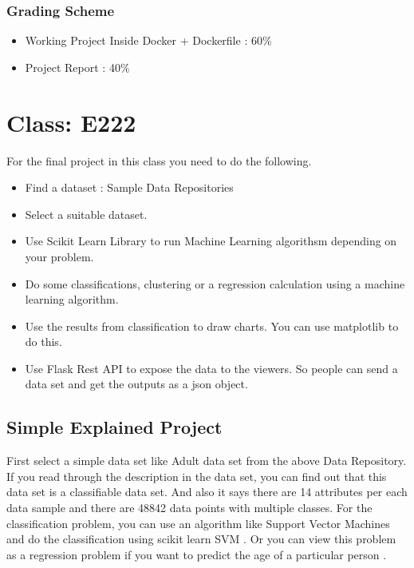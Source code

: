 \subsubsection{Grading Scheme}

\begin{itemize}
\item Working Project Inside Docker + Dockerfile : 60\%
\item Project Report : 40\%
\end{itemize}

\section{Class: E222}\label{s:classe22-proj}

For the final project in this class you need to do the following.

\begin{itemize}
\item Find a dataset : Sample Data Repositories
\item Select a suitable dataset.
\item Use Scikit Learn Library to run Machine Learning algorithsm
  depending on your problem.
\item Do some classifications, clustering or a regression calculation
  using a machine learning algorithm.
\item Use the results from classification to draw charts. You can use
  matplotlib to do this.
\item Use Flask Rest API to expose the data to the viewers. So people
  can send a data set and get the outputs as a json object.
\end{itemize}


\subsection{Simple Explained Project}\label{s:e222-proj-exp}

First select a simple data set like Adult data set from the above Data
Repository. If you read through the description in the data set, you
can find out that this data set is a classifiable data set. And also
it says there are 14 attributes per each data sample and there are
48842 data points with multiple classes. For the classification
problem, you can use an algorithm like Support Vector Machines and do
the classification using scikit learn SVM
. Or you can view
this problem as a regression problem if you want to predict the age of
a particular person
.

